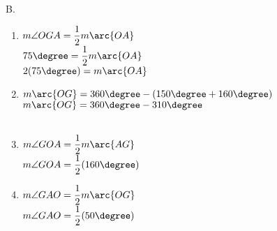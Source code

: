 
B. \phantom{B} 
\begin{enumerate}[label = \arabic*. ]
\item $m\angle{OGA}=\dfrac{1}{2}m\arc{OA}$ \redcheck \\
$75 \degree =\dfrac{1}{2}m\arc{OA}$ \redcheck \\
$2(75 \degree)=m\arc{OA}$ \redcheck \\
 \redcheck  

\item $m\arc{OG}=360 \degree -(150\degree + 160 \degree) $\redcheck \\
$m\arc{OG}=360 \degree -310\degree $\redcheck \\
\redcheck \\

\item $m\angle{GOA}=\dfrac{1}{2}m\arc{AG}$ \redcheck \\
$m\angle{GOA}=\dfrac{1}{2}(160 \degree) $ \redcheck \\
 \redcheck  

\item $m\angle{GAO}=\dfrac{1}{2}m\arc{OG}$ \redcheck \\
$m\angle{GAO}=\dfrac{1}{2}(50 \degree) $ \redcheck \\
 \redcheck  
\end{enumerate}


     